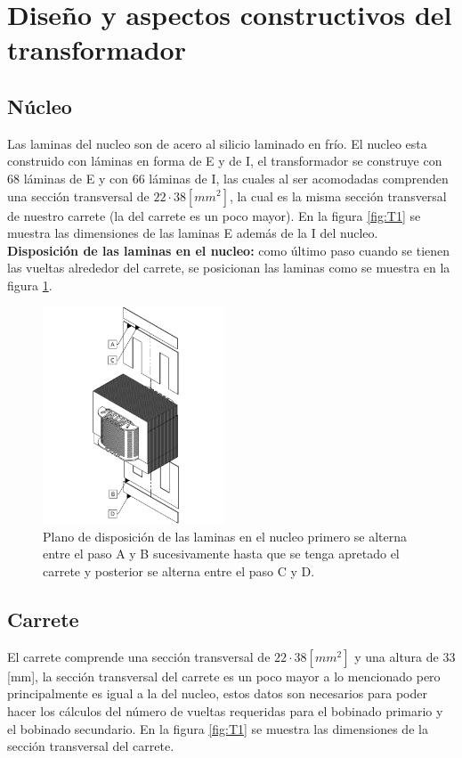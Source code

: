 \section{Diseño y aspectos constructivos del transformador}

\subsection{Núcleo}
Las laminas del nucleo son de acero al silicio laminado en frío. El nucleo esta construido con láminas en forma de E y de I, el transformador se construye con 68 láminas de E y con 66 láminas de I, las cuales al ser acomodadas comprenden una sección transversal de $22 \cdot 38 [mm^{2}]$, la cual es la misma sección transversal de nuestro carrete (la del carrete es un poco mayor).
En la figura \ref{fig:T1} se muestra las dimensiones de las laminas E además de la I del nucleo.
\\\textbf{Disposición de las laminas en el nucleo:} como último paso cuando se tienen las vueltas alrededor del carrete, se posicionan las laminas como se muestra en la figura \ref{fig:T2}. 


\begin{figure}[ht!]
    \centering
    \includegraphics[width=0.48\textwidth]{fot/T2.png}
    \caption{Plano de disposición de las laminas en el nucleo primero se alterna entre el paso A y B sucesivamente hasta que se tenga apretado el carrete y posterior se alterna entre el paso C y D.}
    \label{fig:T2}
\end{figure}



\subsection{Carrete}
El carrete comprende una sección transversal de  $22 \cdot 38 [mm^{2}]$ y una altura de 33 [mm], la sección transversal del carrete es un poco mayor a lo mencionado pero principalmente es igual a la del nucleo, estos datos son necesarios para poder hacer los cálculos del número de vueltas requeridas para el bobinado primario y el bobinado secundario.
En la figura \ref{fig:T1} se muestra las dimensiones de la sección transversal del carrete. 

